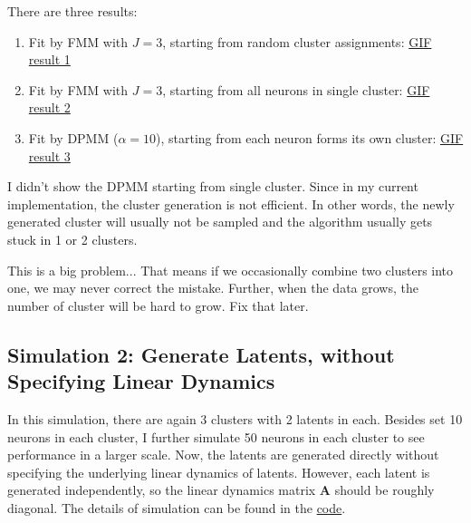 \documentclass[]{article}
\begin{document}
There are three results:
\begin{enumerate}
	\def\labelenumi{(\arabic{enumi})}
	\item
	Fit by FMM with \(J = 3\), starting from random cluster assignments:
	\href{https://github.com/weigcdsb/state-space-clustering/blob/main/results/gif/lds_samp_10_MM_above.gif}{GIF result 1}
	\item
	Fit by FMM with \(J = 3\), starting from all neurons in single cluster: 
	\href{https://github.com/weigcdsb/state-space-clustering/blob/main/results/gif/lds_samp_10_MM_below.gif}{GIF result 2}
	\item
	Fit by DPMM (\(\alpha = 10\)), starting from each neuron forms its own cluster:
	\href{https://github.com/weigcdsb/state-space-clustering/blob/main/results/gif/lds_samp_10_DP_above_10.gif}{GIF result 3}
	
\end{enumerate}
I didn't show the DPMM starting from single cluster. Since in my current implementation, the cluster generation is not efficient. In other words, the newly generated cluster will usually not be sampled and the algorithm usually gets stuck in 1 or 2 clusters.

This is a big problem... That means if we occasionally combine two clusters into one, we may never correct the mistake. Further, when the data grows, the number of cluster will be hard to grow. Fix that later.

\subsection{Simulation 2: Generate Latents, without Specifying Linear Dynamics}
In this simulation, there are again 3 clusters with 2 latents in each. Besides set 10 neurons in each cluster, I further simulate 50 neurons in each cluster to see performance in a larger scale. Now, the latents are generated directly without specifying the underlying linear dynamics of latents. However, each latent is generated independently, so the linear dynamics matrix \(\mathbf{A}\) should be roughly diagonal. The details of simulation can be found in the \href{https://github.com/weigcdsb/state-space-clustering/blob/main/LDS/unspecifiedA_sample.m}{code}.
\end{document}
